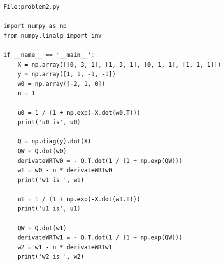 \documentclass[11pt]{article}
\begin{document}
\newpage
\begin{lstlisting}
File:problem2.py

import numpy as np
from numpy.linalg import inv

if __name__ == '__main__':
	X = np.array([[0, 3, 1], [1, 3, 1], [0, 1, 1], [1, 1, 1]])
	y = np.array([1, 1, -1, -1])
	w0 = np.array([-2, 1, 0])
	n = 1

	u0 = 1 / (1 + np.exp(-X.dot(w0.T)))
	print('u0 is', u0)

	Q = np.diag(y).dot(X)
	QW = Q.dot(w0)
	derivateWRTw0 = - Q.T.dot(1 / (1 + np.exp(QW)))
	w1 = w0 - n * derivateWRTw0
	print('w1 is ', w1)

	u1 = 1 / (1 + np.exp(-X.dot(w1.T)))
	print('u1 is', u1)

	QW = Q.dot(w1)
	derivateWRTw1 = - Q.T.dot(1 / (1 + np.exp(QW)))
	w2 = w1 - n * derivateWRTw1
	print('w2 is ', w2)


\end{lstlisting}
\end{document}
